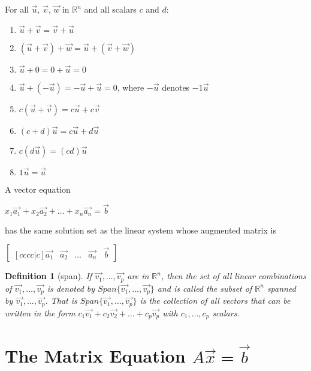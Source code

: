 \documentclass[oneside]{report}
\newtheorem{definition}{Definition}[section]
\begin{document}
For all $\vec{u}$, $\vec{v}$, $\vec{w}$ in $\mathbb{R}^n$ and all scalars $c$ and $d$:
\begin{enumerate}
  \item $\vec{u} + \vec{v} = \vec{v} + \vec{u}$
  \item $(\vec{u} + \vec{v}) + \vec{w} = \vec{u} + (\vec{v} + \vec{w})$
  \item $\vec{u} + 0 = 0 + \vec{u} = 0$
  \item $\vec{u} + (-\vec{u}) = -\vec{u} + \vec{u} = 0$, where $-\vec{u}$ denotes $-1\vec{u}$
  \item $c(\vec{u} + \vec{v}) = c\vec{u} + c\vec{v}$
  \item $(c + d)\vec{u} = c\vec{u} + d\vec{u}$
  \item $c(d\vec{u}) = (cd)\vec{u}$
  \item $1\vec{u} = \vec{u}$
\end{enumerate}

A vector equation

\begin{center}
  $x_1\vec{a_1} + x_2\vec{a_2} + \dots + x_n\vec{a_n} = \vec{b}$
\end{center}

has the same solution set as the linear system whose augmented matrix is

\begin{center}
   $\begin{bmatrix}[cccc|c]
      \vec{a_1} &\vec{a_2} &\dots &\vec{a_n} &\vec{b}
    \end{bmatrix}$
\end{center}

\begin{definition}[span]
  If $\vec{v_1},\dots,\vec{v_p}$ are in $\mathbb{R}^n$, then the set of all linear combinations of $\vec{v_1},\dots,\vec{v_p}$ is denoted by $Span\{\vec{v_1},\dots,\vec{v_p}\}$ and is called the subset of $\mathbb{R}^n$ spanned by $\vec{v_1},\dots,\vec{v_p}$. That is $Span\{\vec{v_1},\dots,\vec{v_p}\}$ is the collection of all vectors that can be written in the form $c_1\vec{v_1} + c_2\vec{v_2} + \dots + c_p\vec{v_p}$ with $c_1,\dots,c_p$ scalars.
\end{definition}

\section{The Matrix Equation $A\vec{x} = \vec{b}$}
\end{document}
